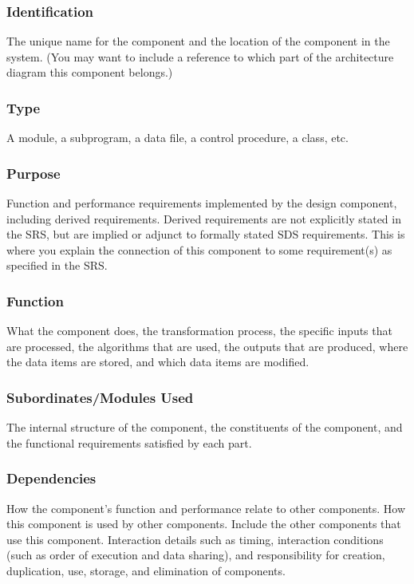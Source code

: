 \documentclass[11pt,a4paper]{article}
\begin{document}
\subsubsection{Identification}
The unique name for the component and the location of the component in the system. (You may want to include a reference to which part of the architecture diagram this component belongs.)

\subsubsection{Type}
A module, a subprogram, a data file, a control procedure, a class, etc.

\subsubsection{Purpose}
Function and performance requirements implemented by the design component, including derived requirements. Derived requirements are not explicitly stated in the SRS, but are implied or adjunct to formally stated SDS requirements. This is where you explain the connection of this component to some requirement(s) as specified in the SRS.

\subsubsection{Function}
What the component does, the transformation process, the specific inputs that are processed, the algorithms that are used, the outputs that are produced, where the data items are stored, and which data items are modified.

\subsubsection{Subordinates/Modules Used}
The internal structure of the component, the constituents of the component, and the functional requirements satisfied by each part.

\subsubsection{Dependencies}
How the component's function and performance relate to other components. How this component is used by other components. Include the other components that use this component. Interaction details such as timing, interaction conditions (such as order of execution and data sharing), and responsibility for creation, duplication, use, storage, and elimination of components.
\end{document}
